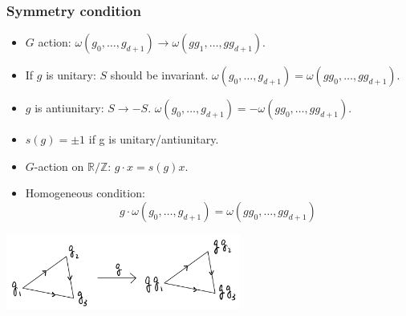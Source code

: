\documentclass[xcolor=table, aspectratio=43,ignorenonframetext]{beamer}
\begin{document}
\begin{frame}
\frametitle{Symmetry condition}

\begin{itemize}
\item $G$ action:
$\omega(g_0, \ldots, g_{d+1})\rightarrow \omega(gg_1, \ldots, gg_{d+1})$.
\item If $g$ is unitary: $S$ should be invariant. $\omega(g_0, \ldots, g_{d+1})= \omega(gg_0, \ldots, gg_{d+1})$.

\item $g$ is antiunitary: $S\rightarrow -S$. $\omega(g_0, \ldots, g_{d+1})= -\omega(gg_0, \ldots, gg_{d+1})$.
\item $s(g)=\pm1$ if g is unitary/antiunitary.
\item $G$-action on $\mathbb R/\mathbb Z$:
$g\cdot x=s(g)x$.
\item Homogeneous condition:
\[g\cdot\omega(g_0, \ldots, g_{d+1})= \omega(gg_0, \ldots, gg_{d+1})\]
\end{itemize}

\begin{center}
\includegraphics[height=2.5cm]{tri-action}
\end{center}
\end{frame}
\end{document}
